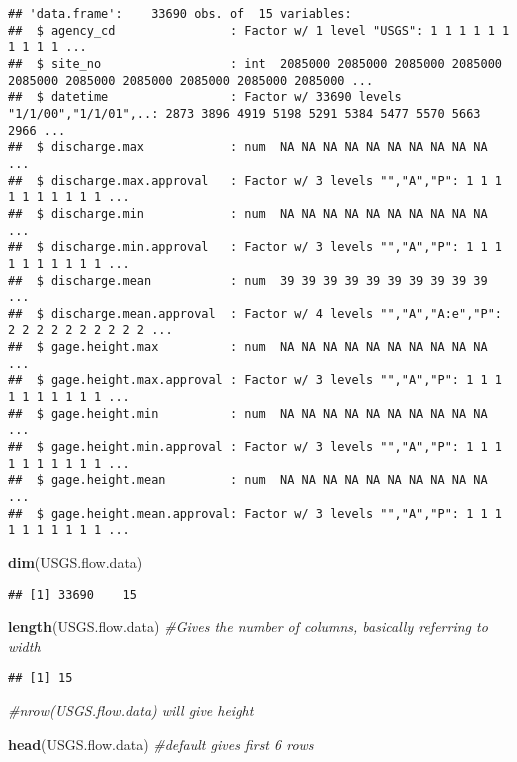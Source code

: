 \documentclass[]{article}
\newenvironment{Shaded}{\begin{snugshade}}{\end{snugshade}}
\newcommand{\CommentTok}[1]{\textcolor[rgb]{0.56,0.35,0.01}{\textit{#1}}}
\newcommand{\KeywordTok}[1]{\textcolor[rgb]{0.13,0.29,0.53}{\textbf{#1}}}
\newcommand{\NormalTok}[1]{#1}
\begin{document}
\begin{verbatim}
## 'data.frame':    33690 obs. of  15 variables:
##  $ agency_cd                : Factor w/ 1 level "USGS": 1 1 1 1 1 1 1 1 1 1 ...
##  $ site_no                  : int  2085000 2085000 2085000 2085000 2085000 2085000 2085000 2085000 2085000 2085000 ...
##  $ datetime                 : Factor w/ 33690 levels "1/1/00","1/1/01",..: 2873 3896 4919 5198 5291 5384 5477 5570 5663 2966 ...
##  $ discharge.max            : num  NA NA NA NA NA NA NA NA NA NA ...
##  $ discharge.max.approval   : Factor w/ 3 levels "","A","P": 1 1 1 1 1 1 1 1 1 1 ...
##  $ discharge.min            : num  NA NA NA NA NA NA NA NA NA NA ...
##  $ discharge.min.approval   : Factor w/ 3 levels "","A","P": 1 1 1 1 1 1 1 1 1 1 ...
##  $ discharge.mean           : num  39 39 39 39 39 39 39 39 39 39 ...
##  $ discharge.mean.approval  : Factor w/ 4 levels "","A","A:e","P": 2 2 2 2 2 2 2 2 2 2 ...
##  $ gage.height.max          : num  NA NA NA NA NA NA NA NA NA NA ...
##  $ gage.height.max.approval : Factor w/ 3 levels "","A","P": 1 1 1 1 1 1 1 1 1 1 ...
##  $ gage.height.min          : num  NA NA NA NA NA NA NA NA NA NA ...
##  $ gage.height.min.approval : Factor w/ 3 levels "","A","P": 1 1 1 1 1 1 1 1 1 1 ...
##  $ gage.height.mean         : num  NA NA NA NA NA NA NA NA NA NA ...
##  $ gage.height.mean.approval: Factor w/ 3 levels "","A","P": 1 1 1 1 1 1 1 1 1 1 ...
\end{verbatim}

\begin{Shaded}
\begin{Highlighting}[]
\KeywordTok{dim}\NormalTok{(USGS.flow.data)}
\end{Highlighting}
\end{Shaded}

\begin{verbatim}
## [1] 33690    15
\end{verbatim}

\begin{Shaded}
\begin{Highlighting}[]
\KeywordTok{length}\NormalTok{(USGS.flow.data) }\CommentTok{#Gives the number of columns, basically referring to width}
\end{Highlighting}
\end{Shaded}

\begin{verbatim}
## [1] 15
\end{verbatim}

\begin{Shaded}
\begin{Highlighting}[]
\CommentTok{#nrow(USGS.flow.data) will give height}

\KeywordTok{head}\NormalTok{(USGS.flow.data) }\CommentTok{#default gives first 6 rows}
\end{Highlighting}
\end{Shaded}
\end{document}
